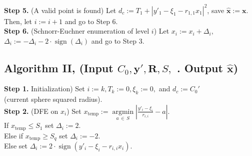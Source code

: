 \documentclass[english,12pt,a4paper,pdftex,sci,utf8]{aaltothesis}
\begin{document}
\noindent \textbf{Step 5.} (A valid point is found) Let $d_c := T_1 + \left|y'_1-\xi_1-r_{1,1}x_1\right|^2$, save $\mathbf{\hat{x}} := \mathbf{x}$. \\
\indent Then, let $i := i+1$ and go to Step 6.\\

\noindent \textbf{Step 6.} (Schnorr-Euchner enumeration of level $i$) Let $x_i := x_i + \Delta_i,$\\
\indent $\Delta_i := -\Delta_i - 2\cdot\operatorname{sign}(\Delta_i)  $ and go to Step 3.\\

\subsection*{Algorithm II, (Input $C_0, \mathbf{y'}, \mathbf{R}, S,$ . Output $\mathbf{\hat{x}}$)}
\label{sec:alg2}
\textbf{Step 1.} Initialization) Set $i := k, T_k := 0, \xi_k := 0,$  and $d_c := C_0'$ \\
\indent (current sphere squared radius). \\

\noindent \textbf{Step 2.} (DFE on $x_i$) Set $x_{\text{temp}} :=\underset{a\,\in\,S}{\operatorname{argmin}}\left|\frac{y'_i - \xi_i}{r_{i,i}} - a \right|$. \\
\indent If $x_{\text{temp}} \leq S_1$ set $\Delta_i := 2$. \\
\indent Else if $x_{\text{temp}} \geq S_{q}$ set $\Delta_i := -2$. \\
\indent Else set $\Delta_i := 2 \cdot \operatorname{sign}\left(y'_i-\xi_i-r_{i,i}x_i\right)$. \\
\end{document}
